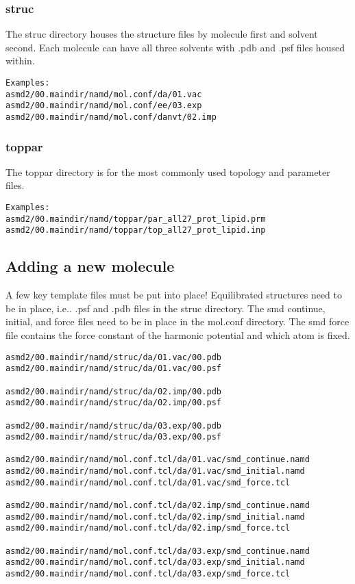 \documentclass[11pt]{article}
\begin{document}
\subsubsection{struc}
The struc directory houses the structure files by molecule first and solvent second. Each molecule can have all three solvents with .pdb and .psf files housed within.
\begin{verbatim}
Examples:
asmd2/00.maindir/namd/mol.conf/da/01.vac
asmd2/00.maindir/namd/mol.conf/ee/03.exp
asmd2/00.maindir/namd/mol.conf/danvt/02.imp
\end{verbatim}

\subsubsection{toppar}
The toppar directory is for the most commonly used topology and parameter files.
\begin{verbatim}
Examples:
asmd2/00.maindir/namd/toppar/par_all27_prot_lipid.prm
asmd2/00.maindir/namd/toppar/top_all27_prot_lipid.inp
\end{verbatim}

\subsection{Adding a new molecule}
A few key template files must be put into place! Equilibrated structures need to be in place, i.e.. .psf and .pdb files in the struc directory. The smd continue, initial, and force files need to be in place in the mol.conf directory. The smd force file contains the force constant of the harmonic potential and which atom is fixed. 
\begin{verbatim}
asmd2/00.maindir/namd/struc/da/01.vac/00.pdb
asmd2/00.maindir/namd/struc/da/01.vac/00.psf

asmd2/00.maindir/namd/struc/da/02.imp/00.pdb
asmd2/00.maindir/namd/struc/da/02.imp/00.psf

asmd2/00.maindir/namd/struc/da/03.exp/00.pdb
asmd2/00.maindir/namd/struc/da/03.exp/00.psf

asmd2/00.maindir/namd/mol.conf.tcl/da/01.vac/smd_continue.namd
asmd2/00.maindir/namd/mol.conf.tcl/da/01.vac/smd_initial.namd
asmd2/00.maindir/namd/mol.conf.tcl/da/01.vac/smd_force.tcl

asmd2/00.maindir/namd/mol.conf.tcl/da/02.imp/smd_continue.namd
asmd2/00.maindir/namd/mol.conf.tcl/da/02.imp/smd_initial.namd
asmd2/00.maindir/namd/mol.conf.tcl/da/02.imp/smd_force.tcl

asmd2/00.maindir/namd/mol.conf.tcl/da/03.exp/smd_continue.namd
asmd2/00.maindir/namd/mol.conf.tcl/da/03.exp/smd_initial.namd
asmd2/00.maindir/namd/mol.conf.tcl/da/03.exp/smd_force.tcl
\end{verbatim}
\end{document}
